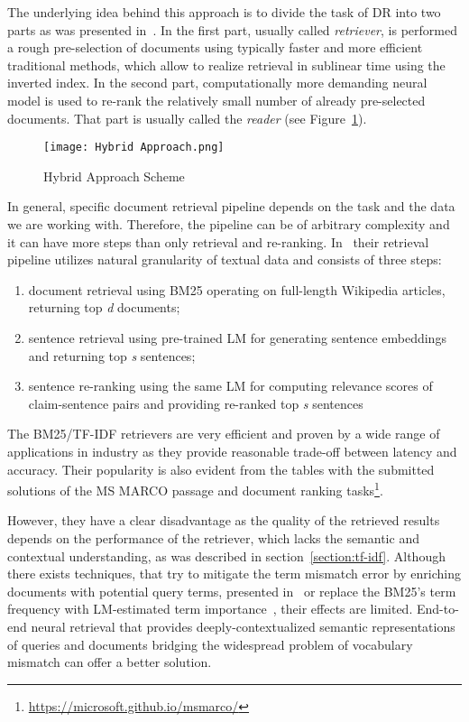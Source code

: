     The underlying idea behind this approach is to divide the task of DR into two parts as was presented in~\parencite{chen2017reading-drqa}. In the first part, usually called \emph{retriever}, is performed a rough pre-selection of documents using typically faster and more efficient traditional methods, which allow to realize retrieval in sublinear time using the inverted index. In the second part, computationally more demanding neural model is used to re-rank the relatively small number of already pre-selected documents. That part is usually called the \emph{reader} (see Figure~\ref{fig:hybrid-approach}). 
    \begin{figure}[H]
        \texttt{[image: Hybrid Approach.png]}
        \centering
        \caption{Hybrid Approach Scheme}
        \label{fig:hybrid-approach}
    \end{figure}
    
    In general, specific document retrieval pipeline depends on the task and the data we are working with. Therefore, the pipeline can be of arbitrary complexity and it can have more steps than only retrieval and re-ranking. In~\parencite{diggelmann2020climatefever} their retrieval pipeline utilizes natural granularity of textual data and consists of three steps: 
    \begin{enumerate}
        \item document retrieval using BM25 operating on full-length Wikipedia articles, returning top \emph{d} documents;
        \item sentence retrieval using pre-trained LM for generating sentence embeddings and returning top \emph{s} sentences;
        \item sentence re-ranking using the same LM for computing relevance scores of claim-sentence pairs and providing re-ranked top \emph{s} sentences
    \end{enumerate}

    The BM25/TF-IDF retrievers are very efficient and proven by a wide range of applications in industry as they provide reasonable trade-off between latency and accuracy. Their popularity is also evident from the tables with the submitted solutions of the MS MARCO passage and document ranking tasks\footnote{\url{https://microsoft.github.io/msmarco/}}.
    
    However, they have a clear disadvantage as the quality of the retrieved results depends on the performance of the retriever, which lacks the semantic and contextual understanding, as was described in section~\ref{section:tf-idf}. Although there exists techniques, that try to mitigate the term mismatch error by enriching documents with potential query terms, presented in~\parencite{nogueira2019document, nogueira2019doc2query} or replace the BM25's term frequency with LM-estimated term importance~\parencite{dai2019contextaware}, their effects are limited.  End-to-end neural retrieval that provides deeply-contextualized semantic representations of queries and documents bridging the widespread problem of vocabulary mismatch can offer a better solution.


